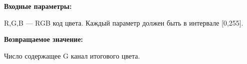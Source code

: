 \textbf{Входные параметры:}  

R,G,B --- RGB код цвета. Каждый параметр должен быть в интервале [0,255].

\textbf{Возвращаемое значение:}

Число содержащее G канал итогового цвета.